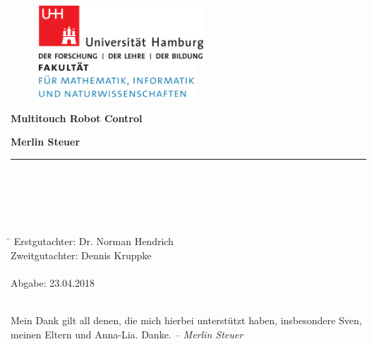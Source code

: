 \begin{titlepage}

  \setcounter{page}{-1}

	\begin{figure}[h]
		\begin{minipage}[b]{62mm}
			\includegraphics[width=62mm]{images/unilogo}
		\end{minipage}
		\hspace{4cm}
		\begin{minipage}[b]{59mm}
			\includegraphics[width=59mm]{images/minlogo}
		\end{minipage}
	\end{figure}

	\vfill
	
	\begin{center}
		\vspace{14mm}
		\noindent \textbf{\huge
		  Multitouch Robot Control \\
		}
		\vspace{60mm}	
	\end{center}
	
	\vfill
	
	\noindent \textbf{Merlin Steuer} \\
	\noindent \rule{\textwidth}{0.4mm} 
	 \\
	 \\
	 \\
	 \\
	\begin{tabbing}
	\hspace{8em} \=  \kill
	Erstgutachter: \> Dr. Norman Hendrich \\
	Zweitgutachter: \> Dennis Kruppke \\
	~ \\
	Abgabe: 23.04.2018
	\end{tabbing}
	
	\newpage 
	\thispagestyle{empty}
	\setcounter{page}{0}

	~\\ \vfill \noindent 
	Mein Dank gilt all denen, die mich hierbei unterstützt haben, insbesondere Sven, meinen Eltern und Anna-Lia. Danke.
	\textit{-- Merlin Steuer}
\end{titlepage}

